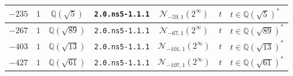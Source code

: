 \documentclass[11pt]{amsart}
\theoremstyle{definition}
\newcommand{\Q}{\mathbb Q}
\newcommand{\QQ}{\mathbb Q}
\begin{document}
{\begin{longtable}{|c|c|c|c|c|l|l|}
$-235$ & $1$ & $\QQ(\sqrt{5})$ & \texttt{2.0.ns5-1.1.1} & $\mathcal N_{-59, 1}(2^{\infty})$ & $t$ & $t\in \Q(\sqrt{5})^*$ \\ \hline




$-267$ & $1$& $\QQ(\sqrt{89})$ &  \texttt{2.0.ns5-1.1.1} & $\mathcal N_{-67, 1}(2^{\infty})$ & $t$ & $t\in \Q(\sqrt{89})^*$ \\ \hline

$-403$ & $1$ & $\QQ(\sqrt{13})$ & \texttt{2.0.ns5-1.1.1} & $\mathcal N_{-101, 1}(2^{\infty})$ & $t$ & $t\in \Q(\sqrt{13})^*$ \\ \hline

$-427$ & $1$& $\QQ(\sqrt{61})$ &  \texttt{2.0.ns5-1.1.1} & $\mathcal N_{-107, 1}(2^{\infty})$ & $t$ & $t\in \Q(\sqrt{61})^*$ \\ \hline


\end{longtable}
}


\end{document}
